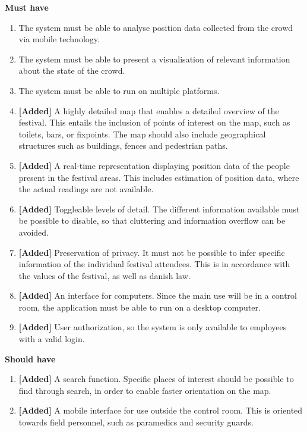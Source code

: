 \textbf{Must have}
\begin{enumerate}
    \item The system must be able to analyse position data collected from the crowd via mobile technology.
    \item The system must be able to present a visualisation of relevant information about the state of the crowd.
    \item The system must be able to run on multiple platforms.
    \item \textbf{[Added]} A highly detailed map that enables a detailed overview of the festival. This entails the inclusion of points of interest on the map, such as toilets, bars, or fixpoints. The map should also include geographical structures such as buildings, fences and pedestrian paths.
    \item \textbf{[Added]} A real-time representation displaying position data of the people present in the festival areas. This includes estimation of position data, where the actual readings are not available.
    \item \textbf{[Added]} Toggleable levels of detail. The different information available must be possible to disable, so that cluttering and information overflow can be avoided.
    \item \textbf{[Added]} Preservation of privacy. It must not be possible to infer specific information of the individual festival attendees. This is in accordance with the values of the festival, as well as danish law.
    \item \label{itm:desktop_req} \textbf{[Added]} An interface for computers. Since the main use will be in a control room, the application must be able to run on a desktop computer.
    \item \textbf{[Added]} User authorization, so the system is only available to employees with a valid login.
\end{enumerate}

\textbf{Should have}
\begin{enumerate}[resume]
    \item \textbf{[Added]} A search function. Specific places of interest should be possible to find through search, in order to enable faster orientation on the map.
    \item \label{itm:mobile_req} \textbf{[Added]} A mobile interface for use outside the control room. This is oriented towards field personnel, such as paramedics and security guards.
\end{enumerate}

